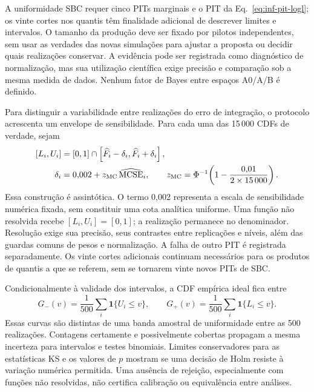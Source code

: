 A uniformidade SBC requer cinco PITs marginais e o PIT da
Eq.~\eqref{eq:inf-pit-logl}; os vinte cortes nos quantis têm finalidade
adicional de descrever limites e intervalos. O tamanho da produção deve
ser fixado por pilotos independentes, sem usar as verdades das novas
simulações para ajustar a proposta ou decidir quais realizações conservar.
A evidência pode ser registrada como diagnóstico de normalização, mas
sua utilização científica exige precisão e comparação sob a mesma
medida de dados. Nenhum fator de Bayes entre espaços A0/A/B é definido.

Para distinguir a variabilidade entre realizações do erro de integração,
o protocolo acrescenta um envelope de sensibilidade. Para cada uma das
15\,000 CDFs de verdade, sejam
\begin{equation}
 \begin{aligned}
 [L_i,U_i]&=[0,1]\cap
 \left[\widehat F_i-\delta_i,\widehat F_i+\delta_i\right],\\
 \delta_i&=0{,}002+z_{\rm MC}\,\widehat{\operatorname{MCSE}}_i,
 \qquad z_{\rm MC}=\Phi^{-1}\!\left(1-\frac{0{,}01}{2\times15\,000}\right).
 \end{aligned}
 \label{eq:inf-pit-envelope}
\end{equation}
Essa construção é assintótica. O termo 0,002 representa a escala de
sensibilidade numérica fixada, sem constituir uma cota analítica uniforme.
Uma função não resolvida recebe \([L_i,U_i]=[0,1]\); a realização permanece
no denominador. Resolução exige sua precisão, seus contrastes entre
replicações e níveis, além das guardas comuns de pesos e normalização.
A falha de outro PIT é registrada separadamente. Os vinte cortes
adicionais continuam necessários para os produtos de quantis a que
se referem, sem se tornarem vinte novos PITs de SBC.

Condicionalmente à validade dos intervalos, a CDF empírica ideal fica
entre
\begin{equation}
 G_-(v)=\frac1{500}\sum_i\mathbf1\{U_i\leq v\},\qquad
 G_+(v)=\frac1{500}\sum_i\mathbf1\{L_i\leq v\}.
 \label{eq:inf-ecdf-envelope}
\end{equation}
Essas curvas são distintas de uma banda amostral de uniformidade entre
as 500 realizações. Contagens certamente e possivelmente cobertas
propagam a mesma incerteza para intervalos e testes binomiais. Limites
conservadores para as estatísticas KS e os valores de \(p\) mostram se
uma decisão de Holm resiste à variação numérica permitida. Uma ausência
de rejeição, especialmente com funções não resolvidas, não certifica
calibração ou equivalência entre análises.

